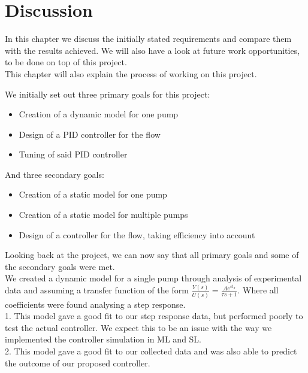 \chapter{Discussion}\label{ch:discussion}

In this chapter we discuss the initially stated requirements
and compare them with the results achieved.
We will also have a look at future work opportunities,
to be done on top of this project.\\
This chapter will also explain the process of working on this project.

We initially set out three primary goals for this project:

\begin{itemize}
\item Creation of a dynamic model for one pump
\item Design of a PID controller for the flow
\item Tuning of said PID controller 
\end{itemize}
And three secondary goals:

\begin{itemize}
\item Creation of a static model for one pump
\item Creation of a static model for multiple pumps
\item Design of a controller for the flow, taking efficiency into account
\end{itemize}
Looking back at the project,
we can now say that all primary goals
and some of the secondary goals were met.
\\
We created a dynamic model for a single pump
through analysis of experimental data
and assuming a transfer function of the form 
$\frac{Y(s)}{U(s)}=\frac{A e^{s t_d}}{\tau s + 1}$.
Where all coefficients were found analysing a step response.
\\

1. This model gave a good fit to our step response data,
but performed poorly to test the actual controller.
We expect this to be an issue with the way we implemented the controller simulation in ML and SL.
\\

2. This model gave a good fit to our collected data
and was also able to predict the outcome of our proposed controller.

